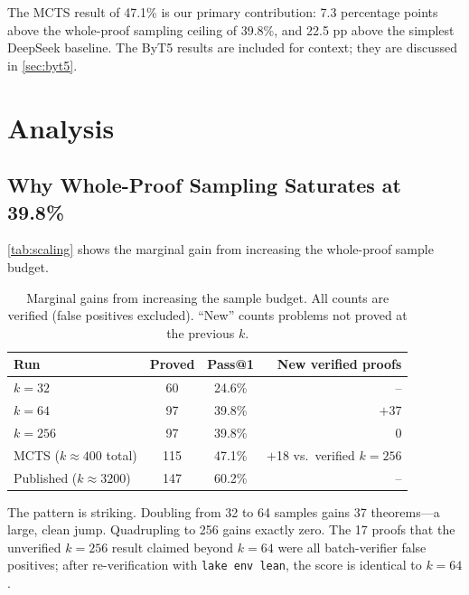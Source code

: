\documentclass[openany, amssymb, psamsfonts]{amsart}
\theoremstyle{definition}
\numberwithin{equation}{section}
\begin{document}
The MCTS result of 47.1\% is our primary contribution: 7.3 percentage points
above the whole-proof sampling ceiling of 39.8\%, and 22.5 pp above the
simplest DeepSeek baseline.
The ByT5 results are included for context; they are discussed in \autoref{sec:byt5}.

\section{Analysis}
\label{sec:analysis}

\subsection{Why Whole-Proof Sampling Saturates at 39.8\%}
\label{sec:scaling}

\autoref{tab:scaling} shows the marginal gain from increasing the whole-proof
sample budget.

\begin{table}[h]
\centering
\caption{Marginal gains from increasing the sample budget. All counts are
verified (false positives excluded). ``New'' counts problems not proved at
the previous $k$.}
\label{tab:scaling}
\begin{tabular}{@{}lccr@{}}
\toprule
Run & Proved & Pass@1 & New verified proofs \\
\midrule
$k = 32$ & 60 & 24.6\% & -- \\
$k = 64$ & 97 & 39.8\% & $+$37 \\
$k = 256$ & 97 & 39.8\% & $\phantom{+}$0 \\
MCTS ($k \approx 400$ total) & 115 & 47.1\% & $+$18 vs.\ verified $k=256$ \\
\midrule
Published ($k \approx 3200$) & 147 & 60.2\% & -- \\
\bottomrule
\end{tabular}
\end{table}

The pattern is striking.
Doubling from 32 to 64 samples gains 37 theorems---a large, clean jump.
Quadrupling to 256 gains exactly zero.
The 17 proofs that the unverified $k=256$ result claimed beyond $k=64$
were all batch-verifier false positives; after re-verification with
\texttt{lake env lean}, the score is identical to $k=64$.
\end{document}
